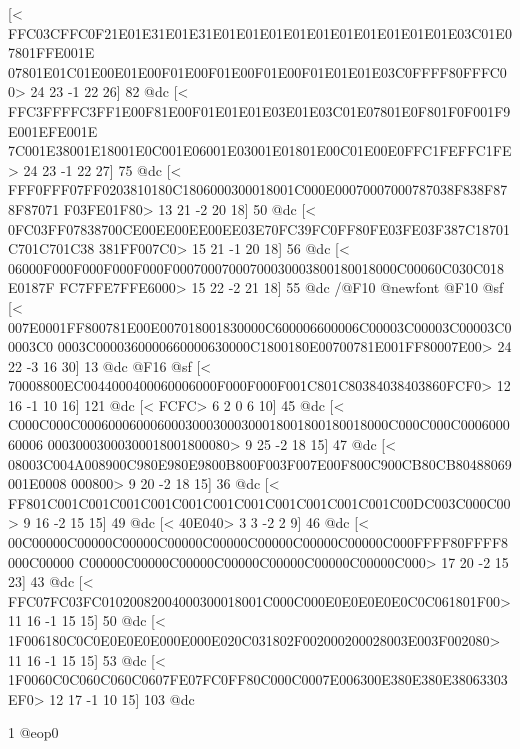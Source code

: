 [<
FFC03CFFC0F21E01E31E01E31E01E01E01E01E01E01E01E01E01E01E03C01E07801FFE001E
07801E01C01E00E01E00F01E00F01E00F01E00F01E01E01E03C0FFFF80FFFC00>
	 24 23 -1 22 26] 82 @dc
[<
FFC3FFFFC3FF1E00F81E00F01E01E01E03E01E03C01E07801E0F801F0F001F9E001EFE001E
7C001E38001E18001E0C001E06001E03001E01801E00C01E00E0FFC1FEFFC1FE>
	 24 23 -1 22 27] 75 @dc
[<
FFF0FFF07FF0203810180C1806000300018001C000E00070007000787038F838F878F87071
F03FE01F80>
	 13 21 -2 20 18] 50 @dc
[<
0FC03FF07838700CE00EE00EE00EE03E70FC39FC0FF80FE03FE03F387C18701C701C701C38
381FF007C0>
	 15 21 -1 20 18] 56 @dc
[<
06000F000F000F000F000F00070007000700030003800180018000C00060C030C018E0187F
FC7FFE7FFE6000>
	 15 22 -2 21 18] 55 @dc
/@F10 @newfont
@F10 @sf
[<
007E0001FF800781E00E007018001830000C600006600006C00003C00003C00003C00003C0
0003C0000360000660000630000C1800180E00700781E001FF80007E00>
	 24 22 -3 16 30] 13 @dc
@F16 @sf
[<
70008800EC0044000400060006000F000F000F001C801C80384038403860FCF0>
	 12 16 -1 10 16] 121 @dc
[<
FCFC>
	 6 2 0 6 10] 45 @dc
[<
C000C000C00060006000600030003000300018001800180018000C000C000C000600060006
00030003000300018001800080>
	 9 25 -2 18 15] 47 @dc
[<
08003C004A008900C980E980E9800B800F003F007E00F800C900CB80CB80488069001E0008
000800>
	 9 20 -2 18 15] 36 @dc
[<
FF801C001C001C001C001C001C001C001C001C001C001C001C00DC003C000C00>
	 9 16 -2 15 15] 49 @dc
[<
40E040>
	 3 3 -2 2 9] 46 @dc
[<
00C00000C00000C00000C00000C00000C00000C00000C00000C000FFFF80FFFF8000C00000
C00000C00000C00000C00000C00000C00000C00000C000>
	 17 20 -2 15 23] 43 @dc
[<
FFC07FC03FC01020082004000300018001C000C000E0E0E0E0E0C0C061801F00>
	 11 16 -1 15 15] 50 @dc
[<
1F006180C0C0E0E0E0E000E000E020C031802F002000200028003E003F002080>
	 11 16 -1 15 15] 53 @dc
[<
1F0060C0C060C060C0607FE07FC0FF80C000C0007E006300E380E380E38063303EF0>
	 12 17 -1 10 15] 103 @dc

1 @eop0

